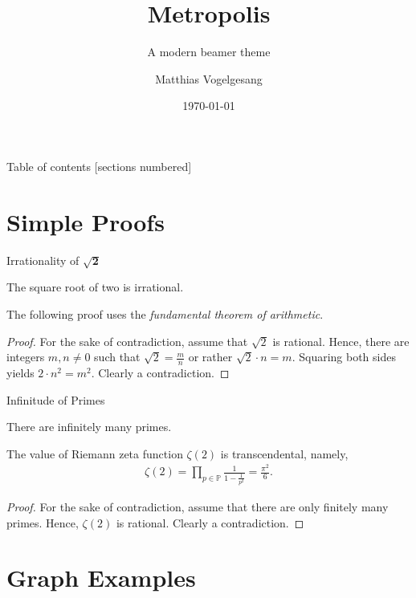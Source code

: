 \documentclass[10pt,aspectratio=169,english]{beamer}
\title{Metropolis}
\subtitle{A modern beamer theme}
\date{\today}
\author{Matthias Vogelgesang}
\institute{Center for modern beamer themes}
\begin{document}
\nocite{beamer} %

\maketitle

\begin{frame}{Table of contents}
  [sections numbered]
  \tableofcontents[hideallsubsections]
\end{frame}

\section{Simple Proofs}

\begin{frame}{Irrationality of $\mathbf{\sqrt{2}}$}
	\begin{theorem}
	The square root of two is irrational.
	\end{theorem}
 	The following proof uses the \emph{fundamental theorem of arithmetic}.
	\begin{proof}
	For the sake of contradiction, assume that $\sqrt{2}$ is rational. Hence, there are integers $m,n \neq 0$ such that $\sqrt{2} = \frac{m}{n}$ or rather $\sqrt{2} \cdot n = m$.
        Squaring both sides yields $2 \cdot n^2 = m^2$. Clearly a contradiction.
	\end{proof}
\end{frame}

\begin{frame}{Infinitude of Primes}
	\begin{theorem}
	There are infinitely many primes.
	\end{theorem}
	\begin{lemma}
	The value of Riemann zeta function $\zeta(2)$ is transcendental, namely,
	\begin{align*}\zeta(2) = \prod\limits_{p \in \mathbb{P}} \frac{1}{1 - \frac{1}{p^2}} = \frac{\pi^2}{6}.\end{align*}
	\end{lemma}
	\begin{proof}
	For the sake of contradiction, assume that there are only finitely many primes. Hence, $\zeta(2)$ is rational. Clearly a contradiction.
	\end{proof}
\end{frame}

\section{Graph Examples}
\end{document}
